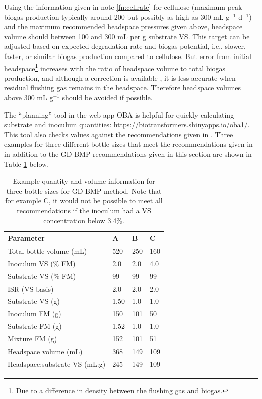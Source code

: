 \documentclass[]{article}
\begin{document}
Using the information given in note \ref{fn:cellrate} for cellulose (maximum peak biogas production typically around 200 but possibly as high as 300 mL g$^{-1}$ d$^{-1}$) and the maximum recommended headspace pressures given above, headspace volume should between 100 and 300 mL per g substrate VS.
This target can be adjusted based on expected degradation rate and biogas potential, i.e., slower, faster, or similar biogas production compared to cellulose.
But error from initial headspace\footnote{Due to a difference in density between the flushing gas and biogas.} increases with the ratio of headspace volume to total biogas production, and although a correction is available \citep{justesenDevelopmentValidationLowcost2019}, it is less accurate when residual flushing gas remains in the headspace.
Therefore headspace volumes above 300 mL g$^{-1}$ should be avoided if possible.

The ``planning'' tool in the web app OBA is helpful for quickly calculating substrate and inoculum quantities: \url{https://biotransformers.shinyapps.io/oba1/}.
This tool also checks values against the recommendations given in \citet{holligerStandardizationBiomethanePotential2016}.
Three examples for three different bottle sizes that meet the recommendations given in \citet{holligerStandardizationBiomethanePotential2016} in addition to the GD-BMP recommendations given in this section are shown in Table \ref{tab:examples} below.

\begin{table}[h] 
\centering
\caption{Example quantity and volume information for three bottle sizes for GD-BMP method. Note that for example C, it would not be possible to meet all recommendations if the inoculum had a VS concentration below 3.4\%.}
\label{tab:examples}
\begin{tabular}{llll}
\hline
Parameter                     & A    & B   & C   \\
\hline
Total bottle volume (mL)      & 520  & 250 & 160 \\
Inoculum VS (\% FM)           & 2.0  & 2.0 & 4.0 \\
Substrate VS (\% FM)          & 99   & 99  & 99  \\
ISR (VS basis)                & 2.0  & 2.0 & 2.0 \\
Substrate VS (g)              & 1.50 & 1.0 & 1.0 \\
Inoculum FM (g)               & 150  & 101 & 50  \\
Substrate FM (g)              & 1.52 & 1.0 & 1.0 \\
Mixture FM (g)                & 152  & 101 & 51  \\
Headspace volume (mL)         & 368  & 149 & 109 \\
Headspace:substrate VS (mL:g) & 245  & 149 & 109 \\
\hline
\end{tabular}
\end{table}
\end{document}
